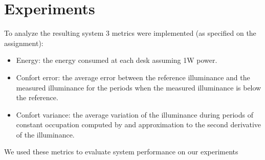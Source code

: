 \section{Experiments}

To analyze the resulting system 3 metrics were implemented (as specified on the assignment):
\begin{itemize}
    \item Energy: the energy consumed at each desk assuming 1W power.

    \item Confort error: the average error between the reference illuminance and the measured
illuminance for the periods when the measured illuminance is below the reference.

    \item Confort variance: the average variation of the illuminance during periods of constant occupation computed by and approximation to the second derivative of the illuminance.
\end{itemize}

We used these metrics to evaluate system performance on our experiments
